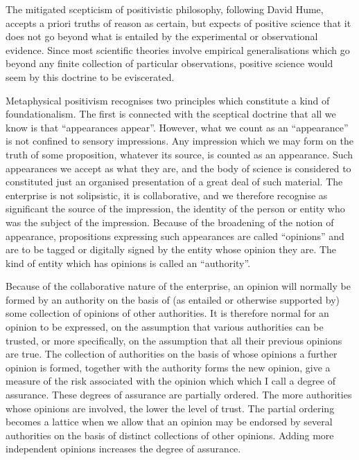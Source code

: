 The mitigated scepticism of positivistic philosophy, following David
Hume, accepts a priori truths of reason as certain, but expects of
positive science that it does not go beyond what is entailed by the
experimental or observational evidence.
Since most scientific theories involve empirical generalisations which
go beyond any finite collection of particular observations, positive
science would seem by this doctrine to be eviscerated.

Metaphysical positivism recognises two principles which constitute a
kind of foundationalism.
The first is connected with the sceptical doctrine that all we know is
that ``appearances appear''.
However, what we count as an ``appearance'' is not confined to sensory
impressions.
Any impression which we may form on the truth of some proposition,
whatever its source, is counted as an appearance.
Such appearances we accept as what they are, and the body of science
is considered to constituted just an organised presentation of a great
deal of such material.
The enterprise is not solipsistic, it is collaborative, and we
therefore recognise as significant the source of the impression, the
identity of the person or entity who was the subject of the
impression.
Because of the broadening of the notion of appearance, propositions
expressing such appearances are called ``opinions'' and are to be
tagged or digitally signed by the entity whose opinion they are.
The kind of entity which has opinions is called an ``authority''.

Because of the collaborative nature of the enterprise, an opinion will
normally be formed by an authority on the basis of (as entailed or
otherwise supported by) some collection of opinions of other authorities.
It is therefore normal for an opinion to be expressed, on the
assumption that various authorities can be trusted, or more
specifically, on the assumption that all their previous opinions are
true.
The collection of authorities on the basis of whose opinions a further
opinion is formed, together with the authority forms the new opinion,
give a measure of the risk associated with the opinion which which I
call a degree of assurance.
These degrees of assurance are partially ordered.
The more authorities whose opinions are involved, the lower the level
of trust.
The partial ordering becomes a lattice when we allow that an opinion
may be endorsed by several authorities on the basis of distinct
collections of other opinions.
Adding more independent opinions increases the degree of assurance.

